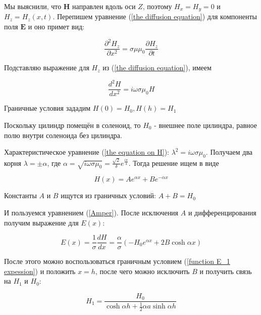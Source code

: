 \documentclass[a4paper, 12pt]{article} %
\begin{document}
Мы выяснили, что $\mathbf{H}$ направлен вдоль оси $Z$, поэтому $H_x = H_y = 0$ и $H_z = H_z (x, t)$. Перепишем уравнение (\ref{the diffusion equation}) для компоненты поля $\mathbf{E}$ и оно примет вид:

\[ \frac{\partial^2 H_z}{\partial x^2} = \sigma \mu \mu_0 \frac{\partial H_z}{\partial t}\]

Подставляю выражение для $H_z$ из (\ref{the diffusion equation}), имеем

\begin{equation}
    \frac{d^2 H}{d x^2} = i \omega \sigma \mu_0 H
    \label{the equation on H}
\end{equation}

Граничные условия зададим $H(0) = H_0, H(h) = H_1$

Поскольку цилиндр помещён в соленоид, то $H_0$ - внешнее поле цилиндра, равное полю внутри соленоида без цилиндра.

Характеристическое уравнение (\ref{the equation on H}): $\lambda^2 = i \omega \sigma \mu_0$. Получаем два корня $\lambda = \pm \alpha$, где $\alpha = \sqrt{i \omega \sigma \mu_0} = \frac{\sqrt{2}}{\delta} e^{\frac{i \pi}{4}}$. Тогда решение ищем в виде

\[H(x) = A e^{\alpha x} + Be^{-\alpha x}\]

Константы $A$ и $B$ ищутся из граничных условий: $A + B = H_0$

И пользуемся уравнением (\ref{Amper}). После исключения $A$ и дифференцирования получим выражение для $E(x)$:

\[E(x) = \frac{1}{\sigma} \frac{d H}{d x} = \frac{\alpha}{\sigma} (- H_0 e^{\alpha x} + 2B \cosh{\alpha x})\]

После этого можно воспользоваться граничным условием (\ref{function E_1 expession}) и положить $x = h$, после чего можно исключить $B$ и получить связь на $H_1$ и $H_0$:

\begin{equation}
    H_1 = \frac{H_0}{\cosh{\alpha h} + \frac{1}{2} \alpha a \sinh{\alpha h}}
    \label{The relationship between the H_1 and H_0}
\end{equation}
\end{document}
